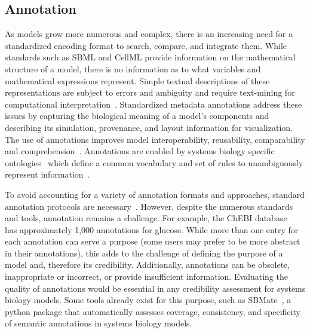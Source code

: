 \documentclass[12pt]{report}
\begin{document}
\subsection{Annotation}

As models grow more numerous and complex, there is an increasing need for a standardized encoding format to search, compare, and integrate them. While standards such as SBML and CellML provide information on the mathematical structure of a model, there is no information as to what variables and mathematical expressions represent. Simple textual descriptions of these representations are subject to errors and ambiguity and require text-mining for computational interpretation~\cite{Curtout2011}. Standardized metadata annotations address these issues by capturing the biological meaning of a model's components and describing its simulation, provenance, and layout information for visualization. The use of annotations improves model interoperability, reusability, comparability and comprehension~\cite{Gennari2021}. Annotations are enabled by systems biology specific ontologies~\cite{Wimalaratne2009} which define a common vocabulary and set of rules to unambiguously represent information~\cite{Noy2001OntologyD1}.
 
To avoid accounting for a variety of annotation formats and approaches, standard annotation protocols are necessary~\cite{Gennari2021}. However, despite the numerous standards and tools, annotation remains a challenge. For example, the ChEBI database~\cite{Hastings2015} has approximately 1,000 annotations for glucose. While more than one entry for each annotation can serve a purpose (some users may prefer to be more abstract in their annotations), this adds to the challenge of defining the purpose of a model and, therefore its credibility.  Additionally, annotations can be obsolete, inappropriate or incorrect, or provide insufficient information. Evaluating the quality of annotations would be essential in any credibility assessment for systems biology models. Some tools already exist for this purpose, such as SBMate~\cite{Shin2021}, a python package that automatically assesses coverage, consistency, and specificity of semantic annotations in systems biology models.
\end{document}
